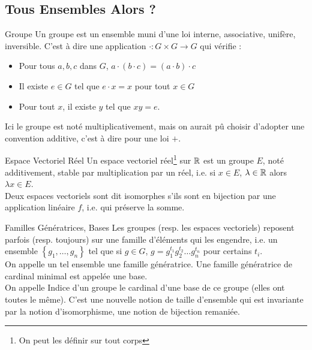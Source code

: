 \documentclass{cours}
\begin{document}
    \subsection{Tous Ensembles Alors ?}
    \begin{définition}{Groupe}{}
        Un groupe est un ensemble muni d'une loi interne, associative, unifère, inversible. C'est à dire une application $\cdot : G \times G \rightarrow G$ qui vérifie : 
    \begin{itemize}
        \item Pour tous $a, b, c$ dans $G$, $a \cdot (b \cdot c) = (a\cdot b) \cdot c$
        \item Il existe $e \in G$ tel que $e \cdot x = x$ pour tout $x \in G$
        \item Pour tout $x$, il existe $y$ tel que $xy = e$.
    \end{itemize}
    Ici le groupe est noté multiplicativement, mais on aurait pû choisir d'adopter une convention additive, c'est à dire pour une loi $+$.
    \end{définition}

    \begin{définition}{Espace Vectoriel Réel}{}
        Un espace vectoriel réel\footnote{On peut les définir sur tout corps} sur $\mathbb{R}$ est un groupe $E$, noté additivement, stable par multiplication par un réel, i.e. si $x \in E$, $\lambda \in \mathbb{R}$ alors $\lambda x \in E$. \\
        Deux espaces vectoriels sont dit isomorphes s'ils sont en bijection par une application linéaire $f$, i.e. qui préserve la somme.
    \end{définition}

    \begin{définition}{Familles Génératrices, Bases}{}
        Les groupes (resp. les espaces vectoriels) reposent parfois (resp. toujours) sur une famille d'éléments qui les engendre, i.e. un ensemble $\left\{g_{1},\ldots, g_{n}\right\}$ tel que si $g \in G$, $g = g_{1}^{t_{1}}g_{2}^{t_{2}}\ldots g_{n}^{t_{n}}$ pour certains $t_{i}$.\\
        On appelle un tel ensemble une famille génératrice. Une famille génératrice de cardinal minimal est appelée une base. \\
        On appelle Indice d'un groupe le cardinal d'une base de ce groupe (elles ont toutes le même). C'est une nouvelle notion de taille d'ensemble qui est invariante par la notion d'isomorphisme, une notion de bijection remaniée.
    \end{définition}
    
\end{document}
